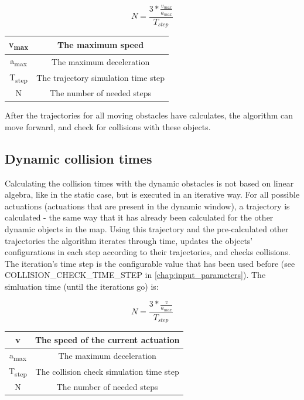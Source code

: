 \[ N = \frac{3 * \frac{v_{max}}{a_{max}}}{T_{step}} \]

\begin{center}
    \begin{tabular}{ | c | c | }
        \hline
        v\textsubscript{max}	& The maximum speed    					\\
        \hline
        a\textsubscript{max}  	& The maximum deceleration      		\\
        \hline
        T\textsubscript{step}  	& The trajectory simulation time step	\\
        \hline
        N  						& The number of needed steps			\\
        \hline
    \end{tabular}
\end{center}

After the trajectories for all moving obstacles have calculates, the algorithm can move forward, and check for collisions with these objects.

\subsection{Dynamic collision times}
Calculating the collision times with the dynamic obstacles is not based on linear algebra, like in the static case, but is executed in an iterative way. For all possible actuations (actuations that are present in the dynamic window), a trajectory is calculated - the same way that it has already been calculated for the other dynamic objects in the map. Using this trajectory and the pre-calculated other trajectories the algorithm iterates through time, updates the objects' configurations in each step according to their trajectories, and checks collisions. The iteration's time step is the configurable value that has been used before (see COLLISION\_CHECK\_TIME\_STEP in \ref{chap:input_parameters}). The simluation time (until the iterations go) is:

\[ N = \frac{3 * \frac{v}{a_{max}}}{T_{step}} \]

\begin{center}
    \begin{tabular}{ | c | c | }
        \hline
        v						& The speed of the current actuation		\\
        \hline
        a\textsubscript{max}  	& The maximum deceleration      			\\
        \hline
        T\textsubscript{step}  	& The collision check simulation time step	\\
        \hline
        N  						& The number of needed steps				\\
        \hline
    \end{tabular}
\end{center}

